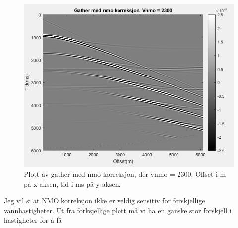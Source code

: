 \documentclass[11pt]{article}
\begin{document}
\begin{figure}[H]
\includegraphics[scale=0.7]{6b_vnmo.png}
\caption{Plott av gather med nmo-korreksjon, der vnmo = 2300. Offset i m på x-aksen, tid i ms på y-aksen.}
\end{figure}

Jeg vil si at NMO korreksjon ikke er veldig sensitiv for forskjellige vannhastigheter. Ut fra forksjellige plott må vi ha en ganske stor forskjell i hastigheter for å få 
\end{document}
